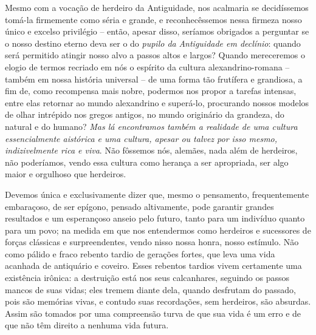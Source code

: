 Mesmo com a
vocação de herdeiro da Antiguidade, nos acalmaria se decidíssemos
tomá-la firmemente como séria e grande, e reconhecêssemos nessa firmeza
nosso único e excelso privilégio -- então, apesar disso, seríamos
obrigados a perguntar se o nosso destino eterno deva ser o do
\emph{pupilo da} \emph{Antiguidade em declínio}: quando será permitido
atingir nosso alvo a passos altos e largos? Quando mereceremos o elogio
de termos recriado em nós o espírito da cultura alexandrino-romana --
também em nossa história universal -- de uma forma tão frutífera e
grandiosa, a fim de, como recompensa mais nobre, podermos nos propor
a tarefas intensas, entre elas retornar ao mundo alexandrino e
superá-lo, procurando nossos modelos de olhar intrépido nos gregos
antigos, no mundo originário da grandeza, do natural e do humano? 
\emph{Mas lá encontramos também a realidade de uma cultura
essencialmente aistórica e uma cultura, apesar ou talvez por isso mesmo,
indizivelmente rica e viva}. Não fôssemos nós, alemães, nada além de
herdeiros, não poderíamos, vendo essa cultura como herança a ser
apropriada, ser algo maior e orgulhoso que herdeiros.

Devemos única e exclusivamente dizer que, mesmo o pensamento,
frequentemente embaraçoso, de ser epígono, pensado altivamente, pode
garantir grandes resultados e um esperançoso anseio pelo futuro, tanto
para um indivíduo quanto para um povo; na medida em que nos entendermos
como herdeiros e sucessores de forças clássicas e surpreendentes, vendo
nisso nossa honra, nosso estímulo. Não como pálido e fraco rebento
tardio de gerações fortes, que leva uma vida acanhada de antiquário e
coveiro. Esses rebentos tardios vivem certamente uma existência irônica:
a destruição está nos seus calcanhares, seguindo os passos mancos de
suas vidas; eles tremem diante dela, quando desfrutam do passado, pois
são memórias vivas, e contudo suas recordações, sem herdeiros, são
absurdas. Assim são tomados por uma compreensão turva de que sua vida é
um erro e de que não têm direito a nenhuma vida futura.

